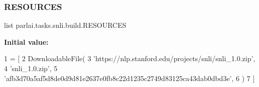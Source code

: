 \subsubsection{\texorpdfstring{R\+E\+S\+O\+U\+R\+C\+ES}{RESOURCES}}
{\footnotesize\ttfamily list parlai.\+tasks.\+snli.\+build.\+R\+E\+S\+O\+U\+R\+C\+ES}

{\bfseries Initial value\+:}
\begin{DoxyCode}
1 =  [
2     DownloadableFile(
3         \textcolor{stringliteral}{'https://nlp.stanford.edu/projects/snli/snli\_1.0.zip'},
4         \textcolor{stringliteral}{'snli\_1.0.zip'},
5         \textcolor{stringliteral}{'afb3d70a5af5d8de0d9d81e2637e0fb8c22d1235c2749d83125ca43dab0dbd3e'},
6     )
7 ]
\end{DoxyCode}
